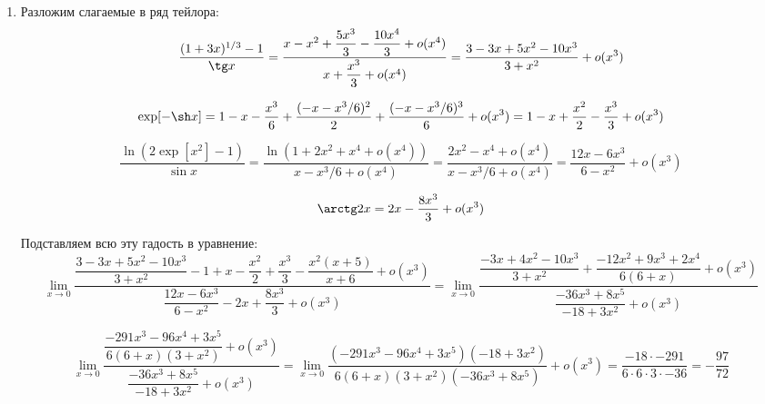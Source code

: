 \documentclass{report}
\begin{document}


\begin{enumerate}
\item Разложим слагаемые в ряд тейлора:\\
\begin{equation*}
	\dfrac{(1+3x)^{1/3}-1}{\tg x}=\dfrac{x-x^2+\dfrac{5x^3}{3}-\dfrac{10x^4}{3}+o(x^4)}{x+\dfrac{x^3}{3}+o(x^4)}=\dfrac{3-3x+5x^2-10x^3}{3+x^2}+o(x^3)\\
\end{equation*}

\begin{equation*}
	\exp[-\sh x]=1-x-\dfrac{x^3}{6}+\dfrac{(-x-x^3/6)^2}{2}+\dfrac{(-x-x^3/6)^3}{6}+o(x^3)=1-x+\dfrac{x^2}{2}-\dfrac{x^3}{3}+o(x^3)
\end{equation*}

\begin{equation*}
	\dfrac{\ln \left(2\exp[x^2]-1\right)}{\sin x}=\dfrac{\ln(1+2x^2+x^4+o(x^4))}{x-x^3/6+o(x^4)}=\dfrac{2x^2-x^4+o(x^4)}{x-x^3/6+o(x^4)}=\dfrac{12x-6x^3}{6-x^2}+o(x^3)
\end{equation*}

\[
\arctg 2x=2x-\dfrac{8x^3}{3}+o(x^3)
\]

Подставляем всю эту гадость в уравнение:\\

\[
\lim\limits_{x\to0}\dfrac{\dfrac{3-3x+5x^2-10x^3}{3+x^2}-1+x-\dfrac{x^2}{2}+\dfrac{x^3}{3}-\dfrac{x^2(x+5)}{x+6}+o(x^3)}{\dfrac{12x-6x^3}{6-x^2}-2x+\dfrac{8x^3}{3}+o(x^3)}=
\lim\limits_{x\to0}\dfrac{\dfrac{-3x+4x^2-10x^3}{3+x^2}+\dfrac{-12x^2+9x^3+2x^4}{6(6+x)}+o(x^3)}{\dfrac{-36x^3+8x^5}{-18+3x^2}+o(x^3)}
\]

\[
\lim\limits_{x\to0} \dfrac{\dfrac{-291x^3-96x^4+3x^5}{6(6+x)(3+x^2)}+o(x^3)}{\dfrac{-36x^3+8x^5}{-18+3x^2}+o(x^3)}=
\lim\limits_{x\to0} \dfrac{(-291x^3-96x^4+3x^5)(-18+3x^2)}{6(6+x)(3+x^2)(-36x^3+8x^5)}+o(x^3)=\dfrac{-18\cdot-291}{6\cdot6\cdot3\cdot-36}=-\dfrac{97}{72}
\]


\end{enumerate}
\end{document}
